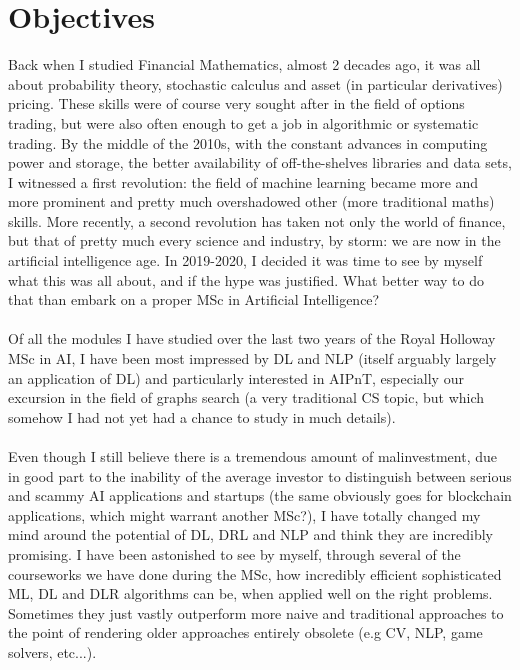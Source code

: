 
\chapter{Objectives} %

\label{Chapter0} %



Back when I studied Financial Mathematics, almost 2 decades ago, it was all about probability theory, stochastic calculus and asset (in particular derivatives) pricing. These skills were of course very sought after in the field of options trading, but were also often enough to get a job in algorithmic or systematic trading. By the middle of the 2010s, with the constant advances in computing power and storage, the better availability of off-the-shelves libraries and data sets, I witnessed a first revolution: the field of machine learning became more and more prominent and pretty much overshadowed other (more traditional maths) skills. More recently, a  second revolution has taken not only the world of finance, but that of pretty much every science and industry, by storm: we are now in the artificial intelligence age.
In 2019-2020, I decided it was time to see by myself what this was all about, and if the hype was justified. What better way to do that than embark on a proper MSc in Artificial Intelligence?
\\
\\
Of all the modules I have studied over the last two years of the Royal Holloway MSc in AI, I have been most impressed by DL and  NLP (itself arguably largely an application of DL) and particularly interested in AIPnT, especially our excursion in the field of graphs search (a very traditional CS topic, but which somehow I had not yet had a chance to study in much details).
\\
\\
Even though I still believe there is a tremendous amount of malinvestment, due in good part to the inability of the average investor to distinguish between serious and scammy AI applications and startups (the same obviously goes for blockchain applications, which might warrant another MSc?), I have totally changed my mind around the potential of DL, DRL and NLP and think they are incredibly promising. I have been astonished to see by myself, through several of the courseworks we have done during the MSc, how incredibly efficient sophisticated ML, DL and DLR algorithms can be, when applied well on the right problems. Sometimes they just vastly outperform more naive and traditional approaches to the point of rendering older approaches entirely obsolete (e.g CV, NLP, game solvers, etc...).
